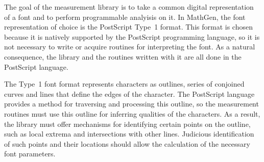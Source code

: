 
The goal of the measurement library is to take a common digital representation
of a font and to perform programmable analyisis on it. In MathGen, the font
representation of choice is the PostScript Type~1 format. This format is chosen
because it is natively supported by the PostScript programming language, so it
is not necessary to write or acquire routines for interpreting the font. As a
natural consequence, the library and the routines written with it are all done
in the PostScript language.

The Type~1 font format represents characters as outlines, series of conjoined
curves and lines that define the edges of the character. The PostScript language
provides a method for traversing and processing this outline, so the measurement
routines must use this outline for inferring qualities of the characters. As a
result, the library must offer mechanisms for identifying certain points on the
outline, such as local extrema and intersections with other lines. Judicious
identification of such points and their locations should allow the calculation
of the necessary font parameters.

